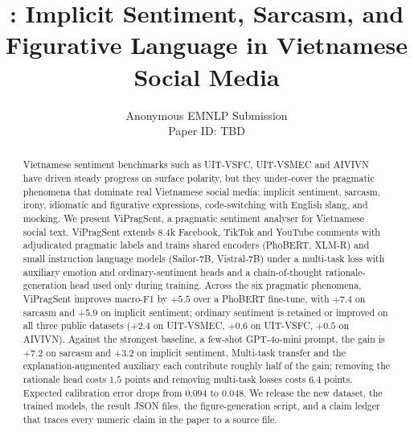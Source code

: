 \documentclass[11pt]{article}
\title{\method{}: Implicit Sentiment, Sarcasm, and Figurative Language in Vietnamese Social Media}
\author{
  Anonymous EMNLP Submission \\
  Paper ID: TBD
}
\newcommand{\method}{ViPragSent}
\begin{document}
\maketitle

\begin{abstract}
Vietnamese sentiment benchmarks such as UIT-VSFC, UIT-VSMEC and AIVIVN
have driven steady progress on surface polarity, but they under-cover
the pragmatic phenomena that dominate real Vietnamese social media:
implicit sentiment, sarcasm, irony, idiomatic and figurative
expressions, code-switching with English slang, and mocking. We
present \method{}, a pragmatic sentiment analyser for Vietnamese
social text. \method{} extends 8.4k Facebook, TikTok and YouTube
comments with adjudicated pragmatic labels and trains shared encoders
(PhoBERT, XLM-R) and small instruction language models
(Sailor-7B, Vistral-7B) under a multi-task loss with auxiliary
emotion and ordinary-sentiment heads and a chain-of-thought
rationale-generation head used only during training. Across the six
pragmatic phenomena, \method{} improves macro-F1 by $+5.5$ over a
PhoBERT fine-tune, with $+7.4$ on sarcasm and $+5.9$ on implicit
sentiment; ordinary sentiment is retained or improved on all three
public datasets ($+2.4$ on UIT-VSMEC, $+0.6$ on UIT-VSFC, $+0.5$ on
AIVIVN). Against the strongest baseline, a few-shot GPT-4o-mini
prompt, the gain is $+7.2$ on sarcasm and $+3.2$ on implicit
sentiment. Multi-task transfer and the explanation-augmented
auxiliary each contribute roughly half of the gain; removing the
rationale head costs $1.5$ points and removing multi-task losses
costs $6.4$ points. Expected calibration error drops from $0.094$ to
$0.048$. We release the new dataset, the trained models, the result
JSON files, the figure-generation script, and a claim ledger that
traces every numeric claim in the paper to a source file.
\end{abstract}













\appendix


\end{document}
